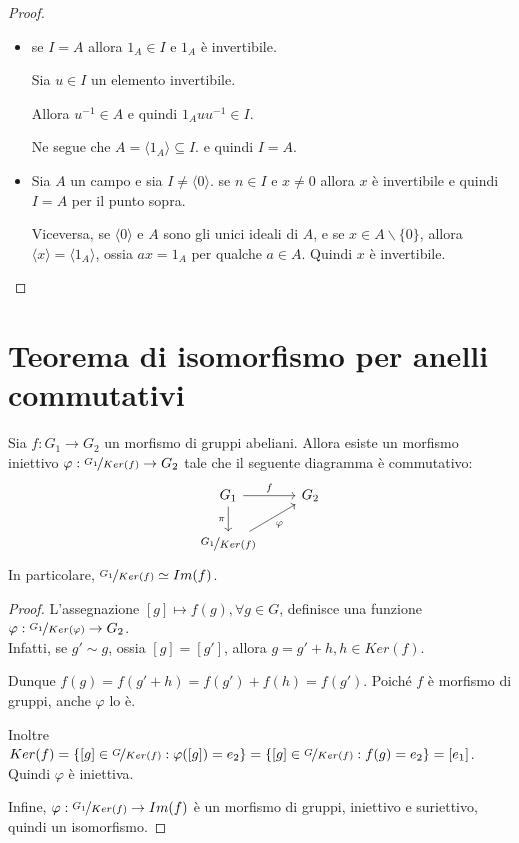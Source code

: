 \documentclass[10pt,a4paper,twoside]{book}
\begin{document}
\begin{proof}
    \
    \begin{itemize}
        \item se $I = A$ allora $1_A \in I$ e $1_A$ è invertibile.

              Sia $u \in I$ un elemento invertibile.

              Allora $u^{-1} \in A$ e quindi $1_A u u^{-1} \in I$.

              Ne segue che $A = \langle 1_A \rangle \subseteq I$. e quindi $I = A$.
        \item Sia $A$ un campo e sia $I \neq \langle 0 \rangle$. se $ n \in I$ e $x \neq 0$ allora $x$ è invertibile e quindi $I = A$
              per il punto sopra.

              Viceversa, se $\langle 0 \rangle$ e $A$ sono gli unici ideali di $A$,
              e se $x \in A  \backslash \{0\}$, allora $\langle x \rangle = \langle 1_A \rangle$, ossia $ax = 1_A$ per qualche $a \in A$. Quindi $x$ è invertibile.
    \end{itemize}
\end{proof}
\newpage


\section{Teorema di isomorfismo per anelli commutativi}

\begin{theorem}
    Sia $f: G_1 \rightarrow G_2$ un morfismo di gruppi abeliani. Allora esiste un morfismo iniettivo $\varphi : \nicefrac{G_1}{Ker (f)} \rightarrow G_2$ tale che il seguente diagramma è commutativo:
    \begin{equation*}
        \begin{tikzcd}
            G_1 \arrow[r, "f"] \arrow[d, "\pi"'] & G_2 \\
            \nicefrac{G_1}{Ker(f)} \arrow[ru, "\varphi"']
        \end{tikzcd}
    \end{equation*}
    In particolare, $\nicefrac{G_1}{Ker(f)} \simeq Im(f)$.
\end{theorem}

\begin{proof}
    L'assegnazione $[g] \mapsto f(g), \forall g \in  G$, definisce una funzione $\varphi : \nicefrac{G_1}{Ker(\varphi)}
        \rightarrow G_2$.\\
    Infatti, se $g' \sim g$, ossia $[g]  = [g']$, allora $g = g' + h , h \in Ker(f)$.

    Dunque $f(g) = f(g' + h) = f(g') + f(h) = f(g')$. Poiché $f$ è morfismo di gruppi, anche $\varphi$ lo è.

    Inoltre $Ker(f) = \{[g] \in \nicefrac{G}{Ker(f)} : \varphi([g]) = e_2\}=\{[g] \in  \nicefrac{G}{Ker(f)} : f(g) = e_2\} = {[e_1]}$. Quindi $\varphi$ è iniettiva.

    Infine, $ \varphi : \nicefrac{G_1}{Ker(f)} \rightarrow Im(f)$ è un morfismo di gruppi, iniettivo e suriettivo, quindi un isomorfismo.
\end{proof}
\end{document}
